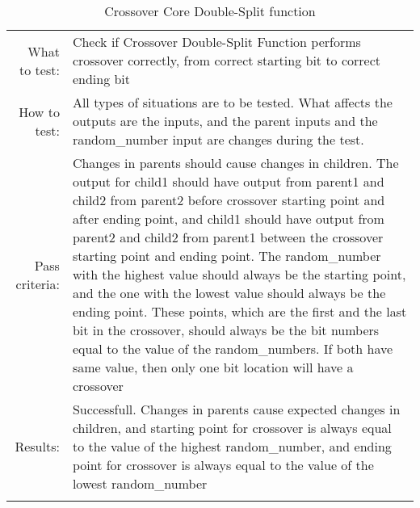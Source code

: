 \begin{table}[H]
  \begin{tabular}{r | p{8cm}}
    \noalign{\smallskip}\hline\noalign{\smallskip}
    
    What to test:  & Check if Crossover Double-Split Function performs crossover
                     correctly, from correct starting bit to correct ending bit \\

    \noalign{\smallskip}\hline\noalign{\smallskip}

    How to test:   &    All types of situations are to be tested. 
                        What affects the outputs are the inputs, and the parent inputs            
                        and the random_number input are changes during the test. 
                        \\
                      
    \noalign{\smallskip}\hline\noalign{\smallskip}

    Pass criteria: &    Changes in parents should cause changes in children. 
                        The output for child1 should have output from parent1 and child2
                        from parent2 before crossover starting point and after ending 
                        point, and child1 should have output from parent2 and child2
                        from parent1 between the crossover starting point and ending
                        point. 
                        The random\_number with the highest value should always be the 
                        starting point, and the one with the lowest value should always
                        be the ending point. 
                        These points, which are the first and the last bit in the 
                        crossover, should always be the bit numbers equal to the value     
                        of the random_numbers. 
                        If both have same value, then only one bit location will have a
                        crossover
                        \\
    \noalign{\smallskip}\hline\noalign{\smallskip}
    
    Results: &      Successfull. 
                    Changes in parents cause expected changes in children, and starting 
                    point for crossover is always equal to the value of the highest 
                    random\_number, and ending point for crossover is always equal to 
                    the value of the lowest random\_number
                    \\
   \noalign{\smallskip}\hline\noalign{\smallskip}
  
  
  
  \end{tabular}
  \caption{Crossover Core Double-Split function}
  \label{testing:components:genetic_pipeline:crossover_core_doublesplit}
\end{table}
